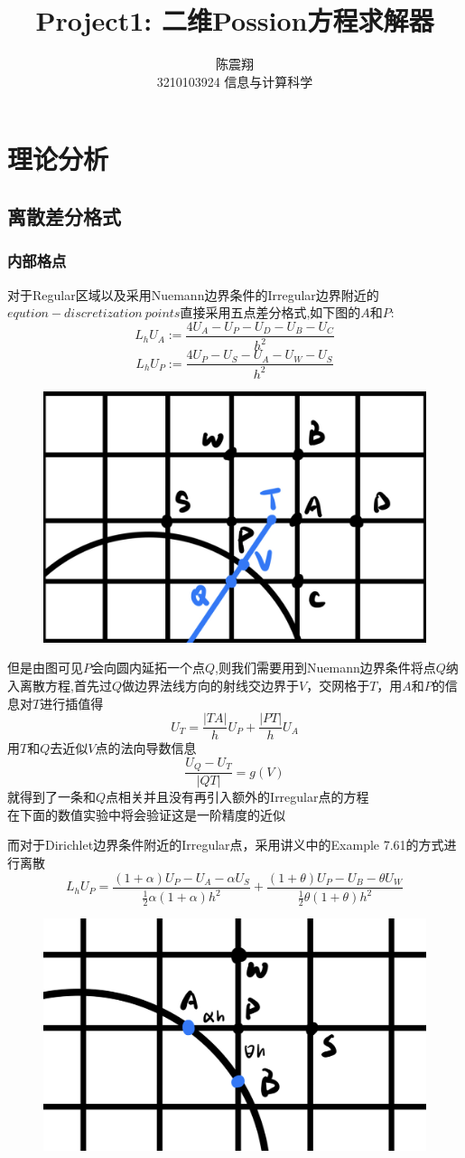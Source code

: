 \documentclass{article}
\title{{\bf Project1: 二维Possion方程求解器}}
\author{陈震翔\\3210103924 信息与计算科学}
\date{}
\begin{document}
\maketitle

\section{理论分析}
\subsection{离散差分格式}
\subsubsection{内部格点}
对于Regular区域以及采用Nuemann边界条件的Irregular边界附近的$eqution-discretization\ points$直接采用五点差分格式,如下图的$A$和$P$:
$$L_hU_A:=\frac{4U_A-U_P-U_D-U_B-U_C}{h^2}$$
$$L_hU_P:=\frac{4U_P-U_S-U_A-U_W-U_S}{h^2}$$
\begin{figure}[h]
    \centering
    \includegraphics[width=0.5\linewidth]{discrete1.PNG}
\end{figure}

但是由图可见$P$会向圆内延拓一个点$Q$,则我们需要用到Nuemann边界条件将点$Q$纳入离散方程,首先过$Q$做边界法线方向的射线交边界于$V$，交网格于$T$，用$A$和$P$的信息对$T$进行插值得
$$U_T=\frac{|TA|}{h}U_P+\frac{|PT|}{h}U_A$$
用$T$和$Q$去近似$V$点的法向导数信息
$$\frac{U_Q-U_T}{|QT|}=g(V)$$
就得到了一条和$Q$点相关并且没有再引入额外的Irregular点的方程\\
在下面的数值实验中将会验证这是一阶精度的近似

\newpage
而对于Dirichlet边界条件附近的Irregular点，采用讲义中的Example 7.61的方式进行离散
$$L_hU_P=\frac{(1+\alpha)U_P-U_A-\alpha U_S}{\frac{1}{2}\alpha(1+\alpha)h^2}+\frac{(1+\theta)U_P-U_B-\theta U_W}{\frac{1}{2}\theta(1+\theta)h^2}$$
\begin{figure}[h]
    \centering
    \includegraphics[width=0.5\linewidth]{discrete2.PNG}
\end{figure}
\end{document}
